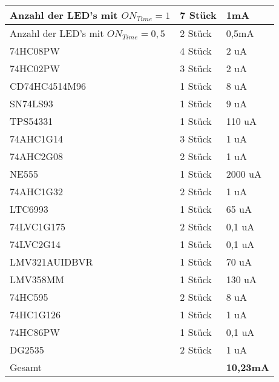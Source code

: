 \renewcommand{\arraystretch}{2}
\begin{tabularx}{\textwidth}{p{}| p{} | p{}}
Anzahl der LED's mit  $ON_{Time} = 1$			&	7 Stück		&	1mA 		\\
\hline
Anzahl der LED's mit  $ON_{Time} = 0,5	$	&	2 Stück		&	0,5mA 		\\
\hline
74HC08PW								&	4 Stück		&	2 uA		\\
\hline
74HC02PW								&	3 Stück		&	2 uA		\\
\hline
CD74HC4514M96							&	1 Stück		&	8 uA		\\
\hline
SN74LS93								&	1 Stück		&	9 uA		\\
\hline
TPS54331								&	1 Stück		&	110 uA		\\
\hline
74AHC1G14								&	3 Stück		&	1 uA		\\
\hline
74AHC2G08								&	2 Stück		&	1 uA		\\
\hline
NE555									&	1 Stück		&	2000 uA		\\
\hline
74AHC1G32								&	2 Stück		&	1 uA		\\
\hline
LTC6993									&	1 Stück		&	65 uA		\\
\hline
74LVC1G175								&	2 Stück		&	0,1 uA		\\
\hline
74LVC2G14								&	1 Stück		&	0,1 uA		\\
\hline
LMV321AUIDBVR							&	1 Stück		&	70 uA		\\
\hline
LMV358MM								&	1 Stück		&	130 uA		\\
\hline
74HC595									&	2 Stück		&	8 uA		\\
\hline
74HC1G126								&	1 Stück		&	1 uA		\\
\hline
74HC86PW								&	1 Stück		&	0,1 uA		\\
\hline
DG2535									&	2 Stück		&	1 uA		\\
\hline 
Gesamt									&				&	\textbf{10,23mA} \\
\end{tabularx}
\renewcommand{\arraystretch}{1}

